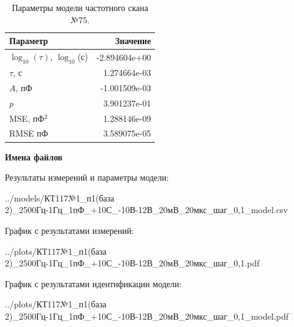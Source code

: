 \begin{table}[!ht]
    \centering
    \caption{Параметры модели частотного скана №75.}
    \begin{tabular}{|l|r|}
        \hline
        Параметр                                       & Значение                  \\ \hline
        $\log_{10}(\tau)$, $\log_{10}$(с)              & -2.894604e+00             \\ \hline
        $\tau$, с                                      & 1.274664e-03              \\ \hline
        $A$, пФ                                        & -1.001509e-03             \\ \hline
        $p$                                            & 3.901237e-01              \\ \hline
        MSE, пФ$^2$                                    & 1.288146e-09              \\ \hline
        RMSE пФ                                        & 3.589075e-05              \\ \hline
    \end{tabular}
    \label{table:frequency_scan_model_75}
\end{table}

\textbf{Имена файлов}

Результаты измерений и параметры модели:

\scriptsize../models/КТ117№1\_п1(база 2)\_2500Гц-1Гц\_1пФ\_+10С\_-10В-12В\_20мВ\_20мкс\_шаг\_0,1\_model.csv
\normalsize

График с результатами измерений:

\scriptsize../plots/КТ117№1\_п1(база 2)\_2500Гц-1Гц\_1пФ\_+10С\_-10В-12В\_20мВ\_20мкс\_шаг\_0,1.pdf
\normalsize

График с результатами идентификации модели:

\scriptsize../plots/КТ117№1\_п1(база 2)\_2500Гц-1Гц\_1пФ\_+10С\_-10В-12В\_20мВ\_20мкс\_шаг\_0,1\_model.pdf
\normalsize

